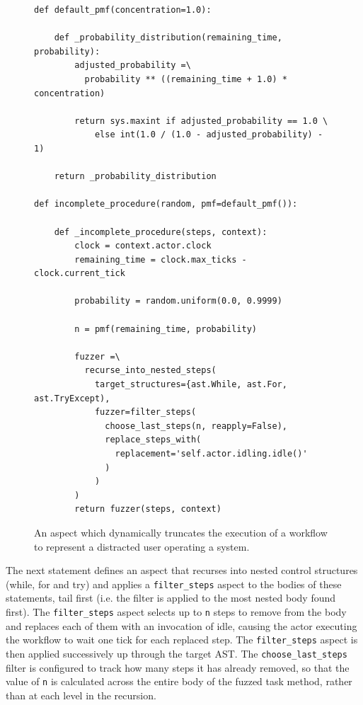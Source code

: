 \documentclass{llncs}
\begin{document}
\begin{figure}[t]
  \centering
\begin{lstlisting}
def default_pmf(concentration=1.0):

    def _probability_distribution(remaining_time, probability):
        adjusted_probability =\
          probability ** ((remaining_time + 1.0) * concentration)

        return sys.maxint if adjusted_probability == 1.0 \
            else int(1.0 / (1.0 - adjusted_probability) - 1)

    return _probability_distribution

def incomplete_procedure(random, pmf=default_pmf()):

    def _incomplete_procedure(steps, context):
        clock = context.actor.clock
        remaining_time = clock.max_ticks - clock.current_tick

        probability = random.uniform(0.0, 0.9999)

        n = pmf(remaining_time, probability)

        fuzzer =\
          recurse_into_nested_steps(
            target_structures={ast.While, ast.For, ast.TryExcept),
            fuzzer=filter_steps(
              choose_last_steps(n, reapply=False),
              replace_steps_with(
                replacement='self.actor.idling.idle()'
              )
            )
        )
        return fuzzer(steps, context)
\end{lstlisting}
  \caption{An aspect which dynamically truncates the execution of a workflow to represent a distracted user operating a
    system.}
  \label{fig:distraction-fuzzer}
\end{figure}


The next statement defines an aspect that recurses into nested control structures (while, for and try) and applies a
\lstinline!filter_steps! aspect to the bodies of these statements, tail first (i.e. the filter is applied to the most
nested body found first).  The \lstinline!filter_steps! aspect selects up to \lstinline!n! steps to remove from the body
and replaces each of them with an invocation of idle, causing the actor executing the workflow to wait one tick for each
replaced step.  The \lstinline!filter_steps! aspect is then applied successively up through the target AST.  The
\lstinline!choose_last_steps! filter is configured to track how many steps it has already removed, so that the value of
\lstinline!n! is calculated across the entire body of the fuzzed task method, rather than at each level in the
recursion.
 
\end{document}
